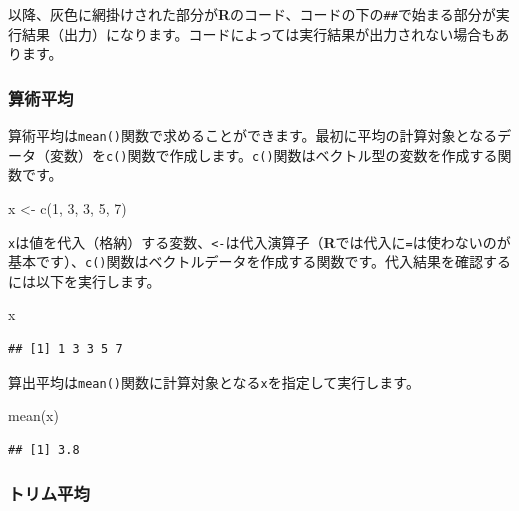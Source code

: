 \documentclass[
  12pt,
]{book}
\newenvironment{Shaded}{\begin{snugshade}}{\end{snugshade}}
\newcommand{\DecValTok}[1]{\textcolor[rgb]{0.00,0.00,0.81}{#1}}
\newcommand{\FunctionTok}[1]{\textcolor[rgb]{0.00,0.00,0.00}{#1}}
\newcommand{\NormalTok}[1]{#1}
\newcommand{\OtherTok}[1]{\textcolor[rgb]{0.56,0.35,0.01}{#1}}
\begin{document}
以降、灰色に網掛けされた部分が\textbf{R}のコード、コードの下の\texttt{\#\#}で始まる部分が実行結果（出力）になります。コードによっては実行結果が出力されない場合もあります。

\hypertarget{ux7b97ux8853ux5e73ux5747}{%
\subsubsection{算術平均}\label{ux7b97ux8853ux5e73ux5747}}

算術平均は\texttt{mean()}関数で求めることができます。最初に平均の計算対象となるデータ（変数）を\texttt{c()}関数で作成します。\texttt{c()}関数はベクトル型の変数を作成する関数です。

\begin{Shaded}
\begin{Highlighting}[]
\NormalTok{x }\OtherTok{\textless{}{-}} \FunctionTok{c}\NormalTok{(}\DecValTok{1}\NormalTok{, }\DecValTok{3}\NormalTok{, }\DecValTok{3}\NormalTok{, }\DecValTok{5}\NormalTok{, }\DecValTok{7}\NormalTok{)}
\end{Highlighting}
\end{Shaded}

\texttt{x}は値を代入（格納）する変数、\texttt{\textless{}-}は代入演算子（\textbf{R}では代入に\texttt{=}は使わないのが基本です）、\texttt{c()}関数はベクトルデータを作成する関数です。代入結果を確認するには以下を実行します。

\begin{Shaded}
\begin{Highlighting}[]
\NormalTok{x}
\end{Highlighting}
\end{Shaded}

\begin{verbatim}
## [1] 1 3 3 5 7
\end{verbatim}

算出平均は\texttt{mean()}関数に計算対象となる\texttt{x}を指定して実行します。

\begin{Shaded}
\begin{Highlighting}[]
\FunctionTok{mean}\NormalTok{(x)}
\end{Highlighting}
\end{Shaded}

\begin{verbatim}
## [1] 3.8
\end{verbatim}

\hypertarget{ux30c8ux30eaux30e0ux5e73ux5747}{%
\subsubsection{トリム平均}\label{ux30c8ux30eaux30e0ux5e73ux5747}}
\end{document}
